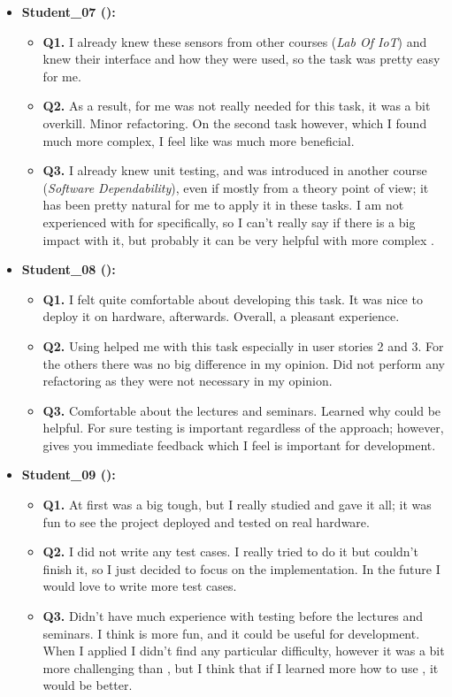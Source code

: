 \begin{itemize}
    \item \textbf{Student\_07 (\tdd):}
    \begin{itemize}
        \item \textbf{Q1.} I already knew these sensors from other courses (\textit{Lab Of IoT}) and knew their interface and how they were used, so the task was pretty easy for me.
        \item \textbf{Q2.} As a result, \tdd for me was not really needed for this task, it was a bit overkill. Minor refactoring. On the second task however, which I found much more complex, I feel like \tdd was much more beneficial. 
        \item \textbf{Q3.} I already knew unit testing, and \tdd was introduced in another course (\textit{Software Dependability}), even if mostly from a theory point of view; it has been pretty natural for me to apply it in these tasks. I am not experienced with \tdd for \ess specifically, so I can't really say if there is a big impact with it, but probably it can be very helpful with more complex \ess.
    \end{itemize}

    \item \textbf{Student\_08 (\tdd):}
    \begin{itemize}
        \item \textbf{Q1.} I felt quite comfortable about developing this task. It was nice to deploy it on hardware, afterwards. Overall, a pleasant experience.
        \item \textbf{Q2.} Using \tdd helped me with this task especially in user stories 2 and 3. For the others there was no big   difference in my opinion. Did not perform any refactoring as they were not necessary in my opinion.
        \item \textbf{Q3.} Comfortable about the lectures and seminars. Learned why \tdd could be helpful. For sure testing \ess is important regardless of the approach; however, \tdd gives you immediate feedback which I feel is important for \es development.
    \end{itemize}

    \item \textbf{Student\_09 (\tdd):}
    \begin{itemize}
        \item \textbf{Q1.} At first was a big tough, but I really studied and gave it all; it was fun to see the project deployed and tested on real hardware.
        \item \textbf{Q2.} I did not write any test cases. I really tried to do it but couldn't finish it, so I just decided to focus on the implementation. In the future I would love to write more test cases.
        \item \textbf{Q3.} Didn't have much experience with testing before the lectures and seminars. I think \tdd is more fun, and it could be useful for \es development. When I applied \tdd I didn't find any particular difficulty, however it was a bit more challenging than \notdd, but I think that if I learned more how to use \tdd, it would be better.
    \end{itemize}
\end{itemize}
